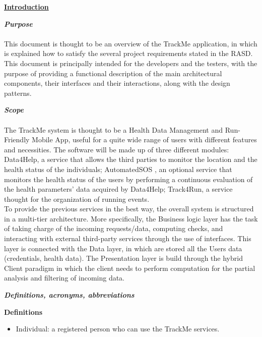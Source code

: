 	\underline{\textbf{Introduction} }
	\begin{legal}
    		\item \textit{\textbf{Purpose}}\\\\
		This document is thought to be an overview of the TrackMe application, in which is explained how to satisfy the several project requirements stated in the RASD. This document is principally intended for the developers and the testers, with the purpose of providing a functional description of the main architectural components, their interfaces and their interactions, along with the design patterns.\\
		\item \textit{\textbf{Scope}}\\\\
		The TrackMe system is thought to be a Health Data Management and Run-Friendly Mobile App, useful for a quite wide range of users with different features and necessities. The software will be made up of three different modules: Data4Help, a service that allows the third parties to monitor the location and the health status
of the individuals; AutomatedSOS , an optional service that monitors the health status of the users by performing
a continuous evaluation of the health parameters' data acquired by Data4Help; Track4Run, a service thought for the organization of running events.\\ 
		To provide the previous services in the best way, the overall system is structured in a multi-tier architecture. More specifically, the Business logic layer has the task of taking charge of the incoming requests/data, computing checks, and interacting with external third-party services through the use of interfaces. This layer is connected with the Data layer, in which are stored all the Users data (credentials, health data). The Presentation layer is build through the hybrid Client paradigm in which the client needs to perform computation for the partial analysis and filtering of incoming data. \\
		\item \textit{\textbf{Definitions, acronyms, abbreviations}}\\
			\begin{legal}
				\item \textbf{Definitions}\\
				\begin{itemize}
					\item Individual: a registered person who can use the TrackMe services.

\end{itemize}
\end{legal}
\end{legal}
